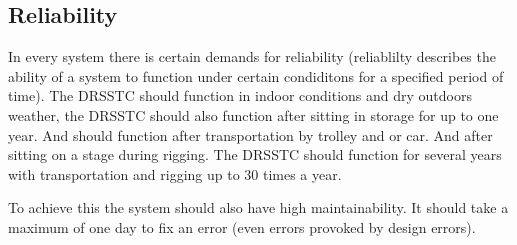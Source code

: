 \subsection{Reliability}
In every system there is certain demands for reliability (reliablilty describes the ability of a system to function under certain condiditons for a specified period of time). The DRSSTC should function in indoor conditions and dry outdoors weather, the DRSSTC should also function after sitting in storage for up to one year. And should function after transportation by trolley and or car. And after sitting on a stage during rigging. The DRSSTC should function for several years with transportation and rigging up to 30 times a year.

To achieve this the system should also have high maintainability. It should take a maximum of one day to fix an error (even errors provoked by design errors).